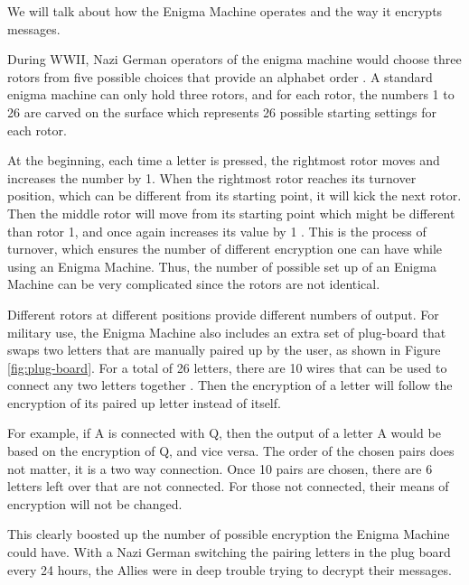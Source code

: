 \documentclass{article}
\begin{document}
We will talk about how the Enigma Machine operates and the way it encrypts messages. 
\par During WWII, Nazi German operators of the enigma machine would choose three rotors from five possible choices that provide an alphabet order \cite{MLB}. A standard enigma machine can only hold three rotors, and for each rotor, the numbers 1 to 26 are carved on the surface which represents 26 possible starting settings for each rotor. 
\par At the beginning, each time a letter is pressed, the rightmost rotor moves and increases the number by 1. When the rightmost rotor reaches its turnover position, which can be different from its starting point, it will kick the next rotor. Then the middle rotor will move from its starting point which might be different than rotor 1, and once again increases its value by 1 \cite{MLB}. This is the process of turnover, which ensures the number of different encryption one can have while using an Enigma Machine. Thus, the number of possible set up of an Enigma Machine can be very complicated since the rotors are not identical.\\ 
\par Different rotors at different positions provide different numbers of output. For military use, the Enigma Machine also includes an extra set of plug-board that swaps two letters that are manually paired up by the user, as shown in Figure \ref{fig:plug-board}. For a total of 26 letters, there are 10 wires that can be used to connect any two letters together \cite{cac}. Then the encryption of a letter will follow the encryption of its paired up letter instead of itself. 
\par For example, if A is connected with Q, then the output of a letter A would be based on the encryption of Q, and vice versa. The order of the chosen pairs does not matter, it is a two way connection. Once 10 pairs are chosen, there are 6 letters left over that are not connected. For those not connected, their means of encryption will not be changed. 
\par This clearly boosted up the number of possible encryption the Enigma Machine could have. With a Nazi German switching the pairing letters in the plug board every 24 hours, the Allies were in deep trouble trying to decrypt their messages.
\end{document}
